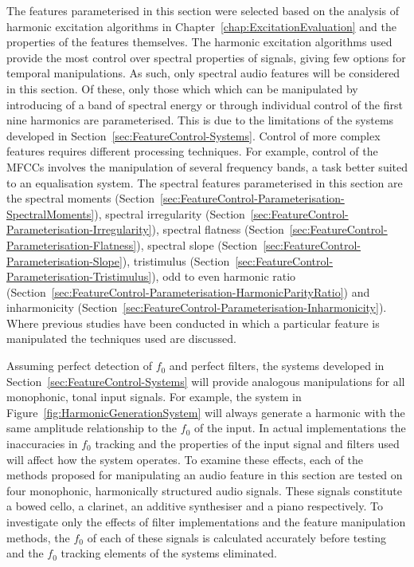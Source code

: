 	The features parameterised in this section were selected based on the analysis of harmonic excitation algorithms in
	Chapter~\ref{chap:ExcitationEvaluation} and the properties of the features themselves. The harmonic excitation
	algorithms used provide the most control over spectral properties of signals, giving few options for temporal
	manipulations. As such, only spectral audio features will be considered in this section. Of these, only those which
	which can be manipulated by introducing of a band of spectral energy or through individual control of the first
	nine harmonics are parameterised. This is due to the limitations of the systems developed in
	Section~\ref{sec:FeatureControl-Systems}. Control of more complex features requires different processing
	techniques. For	example, control of the MFCCs involves the manipulation of several frequency bands, a task better
	suited to an equalisation system. The spectral features parameterised in this section are the spectral moments
	(Section~\ref{sec:FeatureControl-Parameterisation-SpectralMoments}), spectral irregularity
	(Section~\ref{sec:FeatureControl-Parameterisation-Irregularity}), spectral flatness
	(Section~\ref{sec:FeatureControl-Parameterisation-Flatness}), spectral slope
	(Section~\ref{sec:FeatureControl-Parameterisation-Slope}), tristimulus
	(Section~\ref{sec:FeatureControl-Parameterisation-Tristimulus}), odd to even harmonic ratio
	(Section~\ref{sec:FeatureControl-Parameterisation-HarmonicParityRatio}) and inharmonicity
	(Section~\ref{sec:FeatureControl-Parameterisation-Inharmonicity}). Where previous studies have been conducted in
	which a particular feature is manipulated the techniques used are discussed.

	Assuming perfect detection of $f_{0}$ and perfect filters, the systems developed in
	Section~\ref{sec:FeatureControl-Systems} will provide analogous manipulations for all monophonic, tonal input
	signals. For example, the system in Figure~\ref{fig:HarmonicGenerationSystem} will always generate a harmonic with
	the same amplitude relationship to the $f_{0}$ of the input. In actual implementations the inaccuracies in $f_{0}$
	tracking and the properties of the input signal and filters used will affect how the system operates. To examine
	these effects, each of the methods proposed for manipulating an audio feature in this section are tested on four
	monophonic, harmonically structured audio signals. These signals constitute a bowed cello, a clarinet, an additive
	synthesiser and a piano respectively. To investigate only the effects of filter implementations and the feature
	manipulation methods, the $f_{0}$ of each of these signals is calculated accurately before testing and the $f_{0}$
	tracking elements of the systems eliminated.

